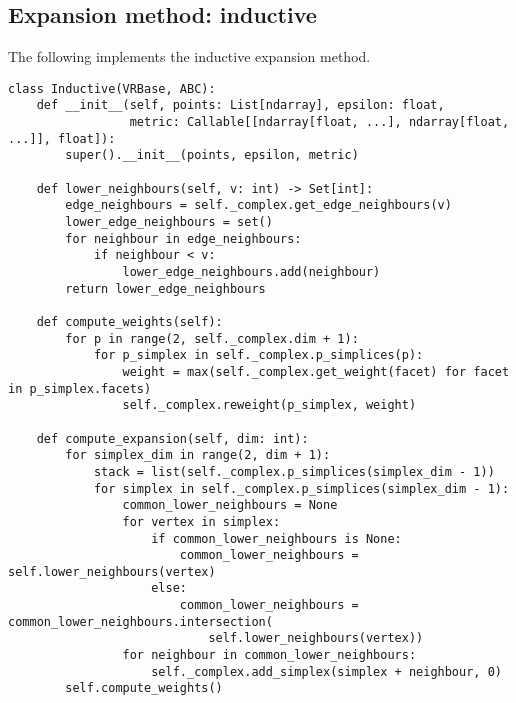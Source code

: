 \subsection{Expansion method: inductive}

The following implements the inductive expansion method.

\begin{verbatim}
class Inductive(VRBase, ABC):
    def __init__(self, points: List[ndarray], epsilon: float,
                 metric: Callable[[ndarray[float, ...], ndarray[float, ...]], float]):
        super().__init__(points, epsilon, metric)

    def lower_neighbours(self, v: int) -> Set[int]:
        edge_neighbours = self._complex.get_edge_neighbours(v)
        lower_edge_neighbours = set()
        for neighbour in edge_neighbours:
            if neighbour < v:
                lower_edge_neighbours.add(neighbour)
        return lower_edge_neighbours

    def compute_weights(self):
        for p in range(2, self._complex.dim + 1):
            for p_simplex in self._complex.p_simplices(p):
                weight = max(self._complex.get_weight(facet) for facet in p_simplex.facets)
                self._complex.reweight(p_simplex, weight)

    def compute_expansion(self, dim: int):
        for simplex_dim in range(2, dim + 1):
            stack = list(self._complex.p_simplices(simplex_dim - 1))
            for simplex in self._complex.p_simplices(simplex_dim - 1):
                common_lower_neighbours = None
                for vertex in simplex:
                    if common_lower_neighbours is None:
                        common_lower_neighbours = self.lower_neighbours(vertex)
                    else:
                        common_lower_neighbours = common_lower_neighbours.intersection(
                            self.lower_neighbours(vertex))
                for neighbour in common_lower_neighbours:
                    self._complex.add_simplex(simplex + neighbour, 0)
        self.compute_weights()
\end{verbatim}

